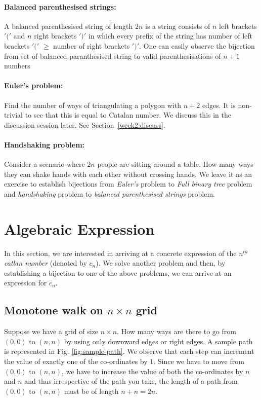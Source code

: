\paragraph{Balanced parenthesised strings:} A balanced parenthesised string of length $2n$ is a string consists of $n$ left brackets $'('$ and $n$ right brackets $')'$ in which every prefix of the string has number of left brackets $'('$ $\geq$ number of right brackets $')'$. One can easily observe the bijection from set of balanced paranthesised string to valid parenthesisations of $n+1$ numbers

\paragraph{Euler's problem:} Find the number of ways of triangulating a polygon with $n+2$ edges. It is non-trivial to see that this is equal to Catalan number. We discuss this in the discussion session later. See Section~\ref{week2:discuss}.

\paragraph{Handshaking problem:} Consider a scenario where $2n$ people are sitting around a table. How many ways they can shake hands with each other without crossing hands. We leave it as an exercise to establish bijections from \emph{Euler's} problem to \emph{Full binary tree} problem and \emph{handshaking} problem to \emph{balanced parenthesised strings} problem.

\section{Algebraic Expression}
In this section, we are interested in arriving at a concrete expression of the $n^{th}$ \emph{catlan number} (denoted by $c_n$). We solve another problem and then, by establishing a bijection to one of the above problems, we can arrive at an expression for $c_n$.

\subsection{Monotone walk on $n\times n$ grid} Suppose we have a grid of size $n\times n$. How many ways are there to go from $(0,0)$ to $(n,n)$ by using only downward edges or right edges. A sample path is represented in Fig. \ref{fig:sample-path}. We observe that each step can increment the value of exactly one of the co-ordinates by $1$. Since we have to move from $(0,0)$ to $(n,n)$, we have to increase the value of both the co-ordinates by $n$ and $n$ and thus irrespective of the path you take, the length of a path from $(0,0)$ to $(n,n)$ must be of length $n+n=2n$.

